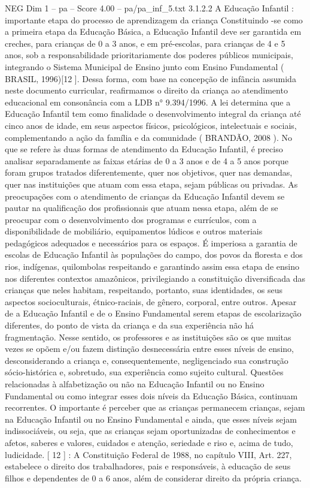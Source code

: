 \begin{textsample}{NEG Dim 1 – pa – Score 4.00 – pa/pa\_inf\_5.txt}  \label{ex:f1_neg_253}
3.1.2.2 A Educação Infantil : importante etapa do processo de aprendizagem da criança Constituindo -se como a primeira etapa da Educação Básica, a Educação Infantil deve ser garantida em creches, para crianças de 0 a 3 anos, e em pré-escolas, para crianças de 4 e 5 anos, sob a responsabilidade prioritariamente dos poderes públicos municipais, integrando o Sistema Municipal de Ensino junto com Ensino Fundamental ( BRASIL, 1996)[12 ].
Dessa forma, com base na concepção de infância assumida neste documento curricular, reafirmamos o direito da criança ao atendimento educacional em consonância com a LDB n{\EmojiFont °} 9.394/1996.
A lei determina que a Educação Infantil tem como finalidade o desenvolvimento integral da criança até cinco anos de idade, em seus aspectos físicos, psicológicos, intelectuais e sociais, complementando a ação da família e da comunidade ( BRANDÃO, 2008 ).
No que se refere às duas formas de atendimento da Educação Infantil, é preciso analisar separadamente as faixas etárias de 0 a 3 anos e de 4 a 5 anos porque foram grupos tratados diferentemente, quer nos objetivos, quer nas demandas, quer nas instituições que atuam com essa etapa, sejam públicas ou privadas.
As preocupações com o atendimento de crianças da Educação Infantil devem se pautar na qualificação dos profissionais que atuam nessa etapa, além de se preocupar com o desenvolvimento dos programas e currículos, com a disponibilidade de mobiliário, equipamentos lúdicos e outros materiais pedagógicos adequados e necessários para os espaços.
É imperiosa a garantia de escolas de Educação Infantil às populações do campo, dos povos da floresta e dos rios, indígenas, quilombolas respeitando e garantindo assim essa etapa de ensino nos diferentes contextos amazônicos, privilegiando a constituição diversificada das crianças que neles habitam, respeitando, portanto, suas identidades, os seus aspectos socioculturais, étnico-raciais, de gênero, corporal, entre outros.
Apesar de a Educação Infantil e de o Ensino Fundamental serem etapas de escolarização diferentes, do ponto de vista da criança e da sua experiência não há fragmentação.
Nesse sentido, os professores e as instituições são os que muitas vezes se opõem e/ou fazem distinção desnecessária entre esses níveis de ensino, desconsiderando a criança e, consequentemente, negligenciado sua construção sócio-histórica e, sobretudo, sua experiência como sujeito cultural.
Questões relacionadas à alfabetização ou não na Educação Infantil ou no Ensino Fundamental ou como integrar esses dois níveis da Educação Básica, continuam recorrentes.
O importante é perceber que as crianças permanecem crianças, sejam na Educação Infantil ou no Ensino Fundamental e ainda, que esses níveis sejam indissociáveis, ou seja, que as crianças sejam oportunizadas de conhecimentos e afetos, saberes e valores, cuidados e atenção, seriedade e riso e, acima de tudo, ludicidade. [ 12 ] : A Constituição Federal de 1988, no capítulo VIII, Art. 227, estabelece o direito dos trabalhadores, pais e responsáveis, à educação de seus filhos e dependentes de 0 a 6 anos, além de considerar direito da própria criança.

\end{textsample}
